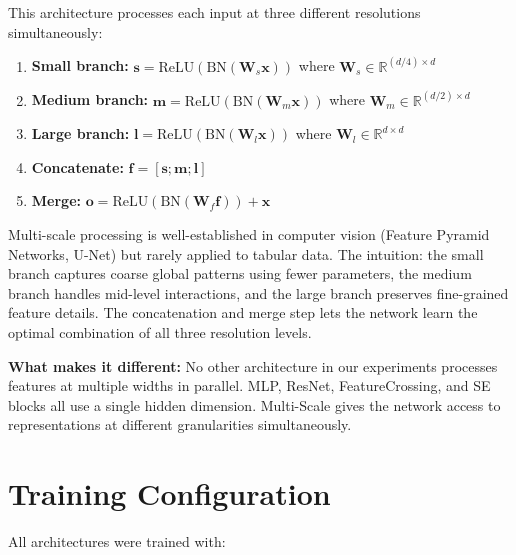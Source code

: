\documentclass[11pt,a4paper]{article}
\begin{document}
This architecture processes each input at three different resolutions simultaneously:

\begin{enumerate}[leftmargin=1.2em,itemsep=0.1em]
    \item \textbf{Small branch:} $\mathbf{s} = \text{ReLU}(\text{BN}(\mathbf{W}_s \mathbf{x}))$ where $\mathbf{W}_s \in \mathbb{R}^{(d/4) \times d}$
    \item \textbf{Medium branch:} $\mathbf{m} = \text{ReLU}(\text{BN}(\mathbf{W}_m \mathbf{x}))$ where $\mathbf{W}_m \in \mathbb{R}^{(d/2) \times d}$
    \item \textbf{Large branch:} $\mathbf{l} = \text{ReLU}(\text{BN}(\mathbf{W}_l \mathbf{x}))$ where $\mathbf{W}_l \in \mathbb{R}^{d \times d}$
    \item \textbf{Concatenate:} $\mathbf{f} = [\mathbf{s}; \mathbf{m}; \mathbf{l}]$
    \item \textbf{Merge:} $\mathbf{o} = \text{ReLU}(\text{BN}(\mathbf{W}_f \mathbf{f})) + \mathbf{x}$
\end{enumerate}

Multi-scale processing is well-established in computer vision (Feature Pyramid Networks, U-Net) but rarely applied to tabular data. The intuition: the small branch captures coarse global patterns using fewer parameters, the medium branch handles mid-level interactions, and the large branch preserves fine-grained feature details. The concatenation and merge step lets the network learn the optimal combination of all three resolution levels.

\textbf{What makes it different:} No other architecture in our experiments processes features at multiple widths in parallel. MLP, ResNet, FeatureCrossing, and SE blocks all use a single hidden dimension. Multi-Scale gives the network access to representations at different granularities simultaneously.

\section{Training Configuration}

All architectures were trained with:
\end{document}
